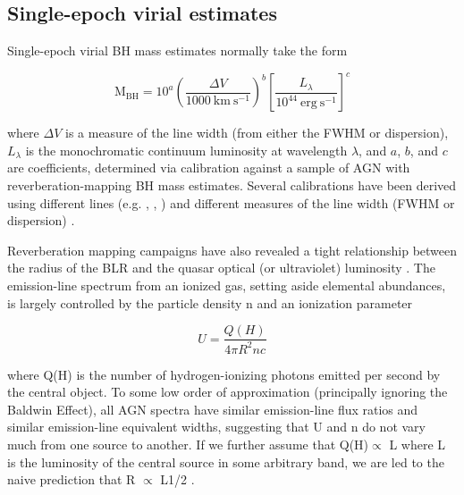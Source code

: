 \subsection{Single-epoch virial estimates}

Single-epoch virial BH mass estimates normally take the form

\begin{equation}
  \label{eq:virialmass}
  \mathrm{M_{BH}} = 10^{a} \left( \frac{\Delta V}{1000~\mathrm{km~s^{-1}}} \right)^b \left[ \frac{L_{\lambda}}{10^{44}~\mathrm{erg~s^{-1}}} \right]^c
\end{equation}

\noindent where $\Delta V$ is a measure of the line width (from either the FWHM or dispersion), $L_\lambda$ is the monochromatic continuum luminosity at wavelength $\lambda$, and $a$, $b$, and $c$ are coefficients, determined via calibration against a sample of AGN with reverberation-mapping BH mass estimates. Several calibrations have been derived using different lines (e.g. \hbns, , ) and different measures of the line width (FWHM or dispersion) \citep[e.g.][]{vestergaard02,mclure02,vestergaard06,mcgill08,wang09,rafiee11,park13}.

Reverberation mapping campaigns have also revealed a tight relationship between the radius of the BLR and the quasar optical (or ultraviolet) luminosity \citep[the $R-L$ relation; e.g.][]{kaspi00,kaspi07}.
The emission-line spectrum from an ionized gas, setting aside elemental abundances,
is largely controlled by the particle density n and an ionization parameter

\begin{equation}
U = \frac{Q(H)}{4{\pi}R^2nc}
\end{equation}

where Q(H) is the number of hydrogen-ionizing photons emitted per second by the central
object. To some low order of approximation (principally ignoring the Baldwin Effect), all
AGN spectra have similar emission-line flux ratios and similar emission-line equivalent
widths, suggesting that U and n do not vary much from one source to another. If we
further assume that Q(H)$\propto$ L where L is the luminosity of the central source in some
arbitrary band, we are led to the naive prediction that R $\propto$ L1/2 .

